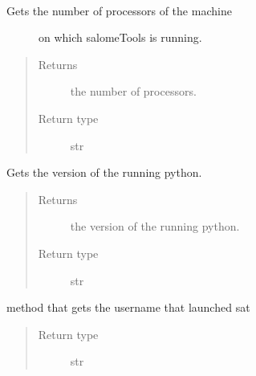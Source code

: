 \documentclass[a4paper,10pt,english]{sphinxmanual}
\begin{document}

\begin{fulllineitems}
\label{\detokenize{commands/apidoc/src:src.architecture.get_nb_proc}}~\begin{description}
\item[{Gets the number of processors of the machine }] \leavevmode
on which salomeTools is running.

\end{description}
\begin{quote}\begin{description}
\item[{Returns}] \leavevmode
the number of processors.

\item[{Return type}] \leavevmode
str

\end{description}\end{quote}

\end{fulllineitems}


\begin{fulllineitems}
\label{\detokenize{commands/apidoc/src:src.architecture.get_python_version}}
Gets the version of the running python.
\begin{quote}\begin{description}
\item[{Returns}] \leavevmode
the version of the running python.

\item[{Return type}] \leavevmode
str

\end{description}\end{quote}

\end{fulllineitems}


\begin{fulllineitems}
\label{\detokenize{commands/apidoc/src:src.architecture.get_user}}
method that gets the username that launched sat
\begin{quote}\begin{description}
\item[{Return type}] \leavevmode
str

\end{description}\end{quote}

\end{fulllineitems}
\end{document}
